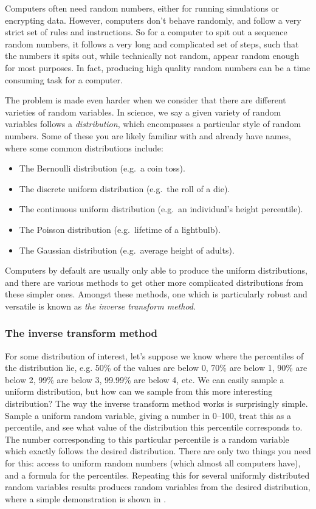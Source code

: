 \documentclass[11pt,a4paper,oneside,english]{extarticle}
\begin{document}
Computers often need random numbers, either for running simulations or encrypting data. However, computers don't behave randomly, and follow a very strict set of rules and instructions. So for a computer to spit out a sequence random numbers, it follows a very long and complicated set of steps, such that the numbers it spits out, while technically not random, appear random enough for most purposes. In fact, producing high quality random numbers can be a time consuming task for a computer.

The problem is made even harder when we consider that there are different varieties of random variables. In science, we say a given variety of random variables follows a \emph{distribution}, which encompasses a particular style of random numbers. Some of these you are likely familiar with and already have names, where some common distributions include:

\begin{itemize}
\item The Bernoulli distribution (e.g.\ a coin toss).
\item The discrete uniform distribution (e.g.\ the roll of a die).
\item The continuous uniform distribution (e.g.\ an individual's height percentile).
\item The Poisson distribution (e.g.\ lifetime of a lightbulb). 
\item The Gaussian distribution (e.g.\ average height of adults).
\end{itemize}

Computers by default are usually only able to produce the uniform distributions, and there are various methods to get other more complicated distributions from these simpler ones. Amongst these methods, one which is particularly robust and versatile is known as \emph{the inverse transform method}.

\subsubsection{The inverse transform method}

For some distribution of interest, let's suppose we know where the percentiles of the distribution lie, e.g. 50\% of the values are below 0, 70\% are below 1, 90\% are below 2, 99\% are below 3, 99.99\% are below  4, etc. We can easily sample a uniform distribution, but how can we sample from this more interesting distribution? The way the inverse transform method works is surprisingly simple. Sample a uniform random variable, giving a number in 0--100, treat this as a percentile, and see what value of the distribution this percentile corresponds to. The number corresponding to this particular percentile is a random variable which exactly follows the desired distribution. There are only two things you need for this: access to uniform random numbers (which almost all computers have), and a formula for the percentiles. Repeating this for several uniformly distributed random variables results produces random variables from the desired distribution, where a simple demonstration is shown in .
\end{document}
